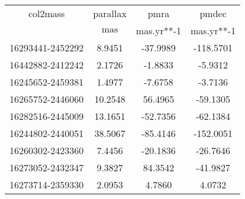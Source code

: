 \begin{table}
\begin{tabular}{cccc}
col2mass & parallax & pmra & pmdec \\
 & $\mathrm{mas}$ & mas.yr**-1 & mas.yr**-1 \\
16293441-2452292 & 8.9451 & -37.9989 & -118.5701 \\
16442882-2412242 & 2.1726 & -1.8833 & -5.9312 \\
16245652-2459381 & 1.4977 & -7.6758 & -3.7136 \\
16265752-2446060 & 10.2548 & 56.4965 & -59.1305 \\
16282516-2445009 & 13.1651 & -52.7356 & -62.1384 \\
16244802-2440051 & 38.5067 & -85.4146 & -152.0051 \\
16260302-2423360 & 7.4456 & -20.1836 & -26.7646 \\
16273052-2432347 & 9.3827 & 84.3542 & -41.9827 \\
16273714-2359330 & 2.0953 & 4.7860 & 4.0732 \\
\end{tabular}
\end{table}
